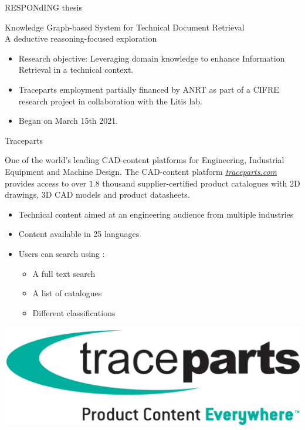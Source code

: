 \begin{frame}{RESPONdING thesis}
    \begin{center}
        Knowledge Graph-based System for Technical Document Retrieval\\A deductive reasoning-focused exploration
    \end{center}
    
    \begin{itemize}
        \item Research objective: Leveraging domain knowledge to enhance Information Retrieval in a technical context.
        \item Traceparts employment partially financed by ANRT as part of a CIFRE research project in collaboration with the Litis lab. 
        \item Began on March 15th 2021.
    \end{itemize}
    
\end{frame}

\begin{frame}{Traceparts}

    One of the world's leading CAD-content platforms for Engineering, Industrial Equipment and Machine Design. The CAD-content platform \emph{\href{http://traceparts.com/}{traceparts.com}} provides access to over $1.8$ thousand supplier-certified product catalogues with 2D drawings, 3D CAD models and product datasheets.

    \begin{itemize}
        \item Technical content aimed at an engineering audience from multiple industries
        \item Content available in 25 languages
        \item Users can search using :
        \begin{itemize}
            \item A full text search
            \item A list of catalogues
            \item Different classifications
        \end{itemize}
    \end{itemize}
    
    \begin{center}
        \includegraphics[scale=0.1]{images/traceparts_logo.png}
    \end{center}
    
\end{frame}